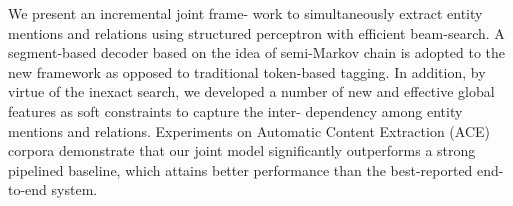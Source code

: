 We present an incremental joint frame- work to simultaneously extract entity mentions and relations using structured perceptron with efficient beam-search. A segment-based decoder based on the idea of semi-Markov chain is adopted to the new framework as opposed to traditional token-based tagging. In addition, by virtue of the inexact search, we developed a number of new and effective global features as soft constraints to capture the inter- dependency among entity mentions and relations. Experiments on Automatic Content Extraction (ACE) corpora demonstrate that our joint model significantly outperforms a strong pipelined baseline, which attains better performance than the best-reported end-to-end system.
